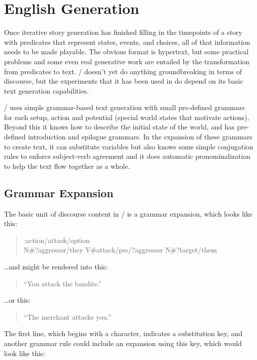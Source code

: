 \section{English Generation}
\label{sec:dunyazad-english}

Once iterative story generation has finished filling in the timepoints of a story with predicates that represent states, events, and choices, all of that information needs to be made playable.
%
The obvious format is hypertext, but some practical problems and some even real generative work are entailed by the transformation from predicates to text.
%
\dunyazad/ doesn't yet do anything groundbreaking in terms of discourse, but the experiments that it has been used in do depend on its basic text generation capabilities.


\dunyazad/ uses simple grammar-based text generation with small pre-defined grammars for each setup, action and potential (special world states that motivate actions).
%
Beyond this it knows how to describe the initial state of the world, and has pre-defined introduction and epilogue grammars.
%
In the expansion of these grammars to create text, it can substitute variables but also knows some simple conjugation rules to enforce subject-verb agreement and it does automatic pronominalization to help the text flow together as a whole.

\subsection{Grammar Expansion}

The basic unit of discourse content in \dunyazad/ is a grammar expansion, which looks like this:
\begin{quote}
\ttfamily
:action/attack/option \\
N\#?aggressor/they V\#attack/prs/?aggressor N\#?target/them
\end{quote}

\noindent \ldots and might be rendered into this:

\begin{quote}
``You attack the bandits.''
\end{quote}

\noindent \ldots or this:

\begin{quote}
``The merchant attacks you.''
\end{quote}

The first line, which begins with a \exchar{:} character, indicates a substitution key, and another grammar rule could include an expansion using this key, which would look like this:

